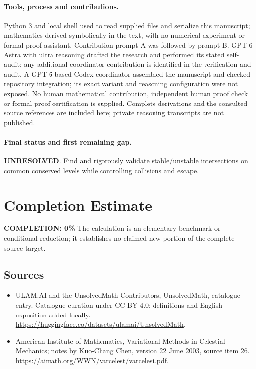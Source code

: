 \documentclass[11pt]{article}
\begin{document}
\paragraph{Tools, process and contributions.}
Python 3 and local shell used to read supplied files and serialize this manuscript; mathematics derived symbolically in the text, with no numerical experiment or formal proof assistant. Contribution prompt A was followed by prompt B. GPT-6 Astra with ultra reasoning drafted the research and performed its stated self-audit; any additional coordinator contribution is identified in the verification and audit. A GPT-6-based Codex coordinator assembled the manuscript and checked repository integration; its exact variant and reasoning configuration were not exposed. No human mathematical contribution, independent human proof check or formal proof certification is supplied. Complete derivations and the consulted source references are included here; private reasoning transcripts are not published.

\paragraph{Final status and first remaining gap.}
\textbf{UNRESOLVED}. Find and rigorously validate stable/unstable intersections on common conserved levels while controlling collisions and escape.

\section{Completion Estimate}
\noindent\textbf{COMPLETION: 0\%}
The calculation is an elementary benchmark or conditional reduction; it establishes no claimed new portion of the complete source target.

\subsection{Sources}
\begin{itemize}
\item[\hypertarget{source:statement:1}{S1}] ULAM.AI and the UnsolvedMath Contributors, UnsolvedMath, catalogue entry. Catalogue curation under CC BY 4.0; definitions and English exposition added locally.
\url{https://huggingface.co/datasets/ulamai/UnsolvedMath}.
\item[\hypertarget{source:statement:2}{S2}] American Institute of Mathematics, Variational Methods in Celestial Mechanics; notes by Kuo-Chang Chen, version 22 June 2003, source item 26.
\url{https://aimath.org/WWN/varcelest/varcelest.pdf}.
\end{itemize}
\label{end:statement}
\end{document}
